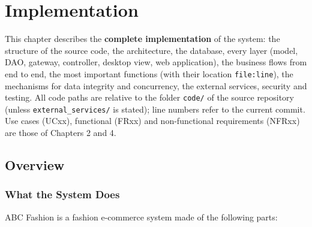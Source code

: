 \chapter{Implementation}\label{ch:implementation}
\providecommand{\tightlist}{\setlength{\itemsep}{0pt}\setlength{\parskip}{0pt}}
\sloppy
This chapter describes the \textbf{complete implementation} of the
system: the structure of the source code, the architecture, the
database, every layer (model, DAO, gateway, controller, desktop view,
web application), the business flows from end to end, the most important
functions (with their location \texttt{file:line}), the mechanisms for
data integrity and concurrency, the external services, security and
testing. All code paths are relative to the folder \texttt{code/\allowbreak{}} of the
source repository (unless \texttt{external\_\allowbreak{}services/\allowbreak{}} is stated); line
numbers refer to the current commit. Use cases (UCxx), functional (FRxx)
and non-functional requirements (NFRxx) are those of Chapters 2 and 4.

\hypertarget{overview}{%
\section{Overview}\label{overview}}

\hypertarget{what-the-system-does}{%
\subsection{What the System Does}\label{what-the-system-does}}

ABC Fashion is a fashion e-commerce system made of the following parts:

